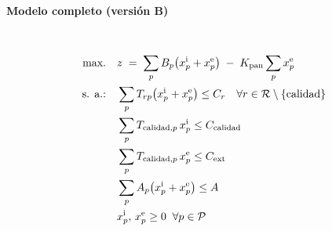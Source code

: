 \paragraph{Modelo completo (versión B)}\mbox{}\\
\begin{align}
\mbox{max.}\quad 
& z \;=\; \sum_{p} B_p\big(x_p^{\mathrm{i}} + x_p^{\mathrm{e}}\big) \;-\; K_{\mathrm{pan}}\sum_{p} x_p^{\mathrm{e}} \notag\\
\mbox{s. a.:}\quad 
& \sum_{p} T_{rp}\big(x_p^{\mathrm{i}} + x_p^{\mathrm{e}}\big) \le C_r \quad \forall r \in \mathcal{R}\setminus\{\mathrm{calidad}\} \notag\\
& \sum_{p} T_{\mathrm{calidad},p}\,x_p^{\mathrm{i}} \le C_{\mathrm{calidad}} \notag\\
& \sum_{p} T_{\mathrm{calidad},p}\,x_p^{\mathrm{e}} \le C_{\mathrm{ext}} \notag\\
& \sum_{p} A_p\big(x_p^{\mathrm{i}} + x_p^{\mathrm{e}}\big) \le A \notag\\
& x_p^{\mathrm{i}},\,x_p^{\mathrm{e}} \ge 0 \;\; \forall p \in \mathcal{P} \notag
\end{align}





